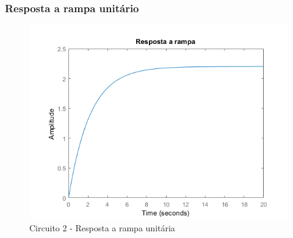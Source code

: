 \documentclass[a4paper, 12pt]{article}
\begin{document}
			\subsubsection{Resposta a rampa unitário}
			\begin{figure}[!ht]
				\centering
				\includegraphics[scale=0.68]{img/1h_circ2.png}
				\caption{Circuito 2 - Resposta a rampa unitária}
			\end{figure}
\end{document}
